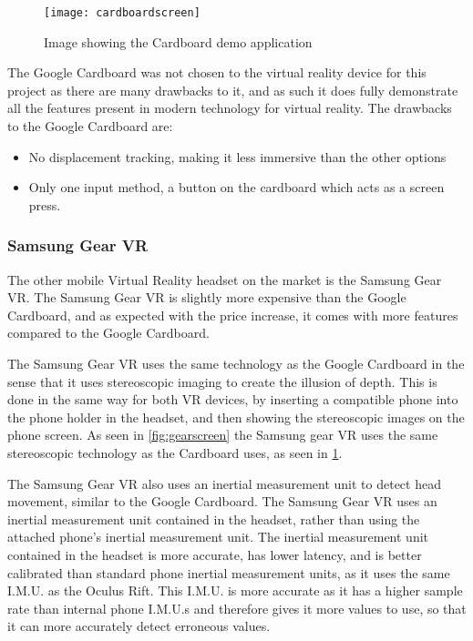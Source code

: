 \begin{figure}[h]
	\texttt{[image: cardboardscreen]}
	\centering
	\caption{Image showing the Cardboard demo application}
	\label{fig:cardboard1}
\end{figure}

The Google Cardboard was not chosen to the virtual reality device for this project as there are many drawbacks to it, and as such it does fully demonstrate all the features present in modern technology for virtual reality. The drawbacks to the Google Cardboard are:

\begin{itemize}
	\item No displacement tracking, making it less immersive than the other options
	\item Only one input method, a button on the cardboard which acts as a screen press.
\end{itemize}

\subsubsection{Samsung Gear VR}
The other mobile Virtual Reality headset on the market is the Samsung Gear VR. The Samsung Gear VR is slightly more expensive than the Google Cardboard, and as expected with the price increase, it comes with more features compared to the Google Cardboard.
\newline
\par
The Samsung Gear VR uses the same technology as the Google Cardboard in the sense that it uses stereoscopic imaging to create the illusion of depth. This is done in the same way for both VR devices, by inserting a compatible phone into the phone holder in the headset, and then showing the stereoscopic images on the phone screen. As seen in \ref{fig:gearscreen} the Samsung gear VR uses the same stereoscopic technology as the Cardboard uses, as seen in \ref{fig:cardboard1}.
\newline
\par
The Samsung Gear VR also uses an inertial measurement unit to detect head movement, similar to the Google Cardboard. The Samsung Gear VR uses an inertial measurement unit contained in the headset, rather than using the attached phone's inertial measurement unit. The inertial measurement unit contained in the headset is more accurate, has lower latency, and is better calibrated than standard phone inertial measurement units, as it uses the same I.M.U. as the Oculus Rift. This I.M.U. is more accurate as it has a higher sample rate than internal phone I.M.U.s and therefore gives it more values to use, so that it can more accurately detect erroneous values.

